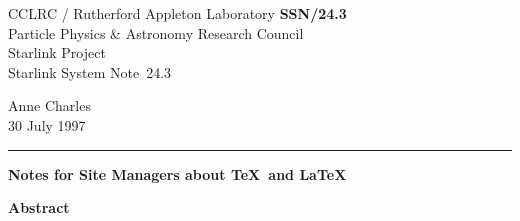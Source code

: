 \documentclass[11pt,twoside]{article}
\newcommand{\stardoccategory}  {Starlink System Note}
\newcommand{\stardocinitials}  {SSN}
\newcommand{\stardocnumber}    {24.3}
\newcommand{\stardocauthors}   {Anne Charles}
\newcommand{\stardocdate}      {30 July 1997}
\newcommand{\stardoctitle}     {Notes for Site Managers about \TeX\ and \LaTeX}
\newcommand{\stardocname}{\stardocinitials /\stardocnumber}
\newenvironment{latexonly}{}{}
\begin{document}
\thispagestyle{empty}

\begin{latexonly}
   CCLRC / {\sc Rutherford Appleton Laboratory} \hfill {\bf \stardocname}\\
   {\large Particle Physics \& Astronomy Research Council}\\
   {\large Starlink Project\\}
   {\large \stardoccategory\ \stardocnumber}
   \begin{flushright}
   \stardocauthors\\
   \stardocdate
   \end{flushright}
   \vspace{-4mm}
   \rule{\textwidth}{0.5mm}
   \vspace{5mm}
   \begin{center}
   {\Large\bf \stardoctitle}
   \end{center}
   \vspace{5mm}

   \vspace{10mm}
   \begin{center}
      {\Large\bf Abstract}
   \end{center}
\end{latexonly}
\end{document}
